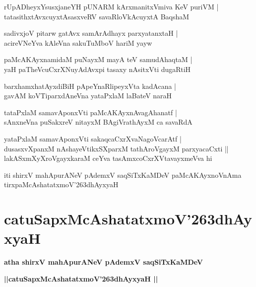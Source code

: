\documentclass[twoside,12pt,openright]{book}
\def\S{\char'263}
\newcounter{shloka}[chapter]
\begin{document}
\begin{shloka}%
rUpADheyxYsusxjaneYH pUNARM kArxmanitxVmiva KeV puriVM |\\
tatasithxtAvxcuyxtAsasxveRV savaRloVkAcuyxtA BaqshaM 
\end{shloka}

\begin{shloka}%
sadivxjoV pitarw gatAvx samArAdhayx parxyatanxtaH |\\
acireVNeYva kAleVna sakuTuMboV hariM yayw 
\end{shloka}

\begin{shloka}%
paMcAKAyxnamidaM puNayxM mayA teV samudAhaqtaM |\\
yaH paTheVcuCxrXNuyAdAvxpi tasaxy nAsitxVti dugaRtiH 
\end{shloka}

\begin{shloka}%
barxhamxhatAyxdiBiH pApeYnaRlipeyxVta kadAcana |\\
gavAM koVTiparxdAneVna yataPxlaM laBateV naraH 
\end{shloka}

\begin{shloka}%
tataPxlaM samavAponxVti paMcAKAyxnAvagAhanatf |\\
sAnxneVna puSakxreV nitayxM BAgiVrathAyxM ca savaRdA 
\end{shloka}

\begin{shloka}%
yataPxlaM samavAponxVti sakaqcaCxrXvaNagoVcarAtf |\\
dusasxvXpanxM nAshayeVtikxSXparxM tathAroVgayxM parxyacaCxti ||\\
lakASxmXyXroVgayxkaraM ceYva tasAmxcoCxrXVtavayxmeVva hi
\end{shloka}

\begin{center}
iti shirxV mahApurANeV pAdemxV saqSiTxKaMDeV paMcAKAyxnoVnAma tirxpaMcAshatatxmoV\S dhAyxyaH 
\end{center}

\chapter{catuSapxMcAshatatxmoV\S dhAyxyaH}

\begin{center}
{\LARGE\bfseries atha shirxV mahApurANeV pAdemxV saqSiTxKaMDeV}
\end{center}

\begin{center}
{\LARGE\bfseries ||catuSapxMcAshatatxmoV\S dhAyxyaH || }
\end{center}
\end{document}
